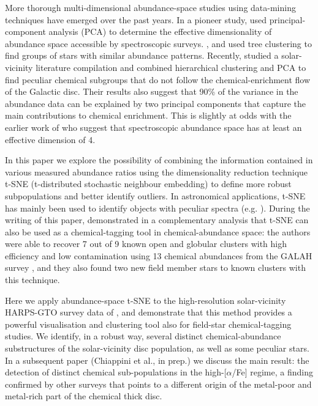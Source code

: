 \documentclass{aa}  %
\begin{document}
More thorough multi-dimensional abundance-space studies using data-mining techniques have emerged over the past years. In a pioneer study, \citet{Ting2012} used principal-component analysis (PCA) to determine the effective dimensionality of abundance space accessible by spectroscopic surveys. \citet{daSilva2012, daSilva2015}, and \citet{Jofre2017} used tree clustering to find groups of stars with similar abundance patterns. Recently, \citet{Boesso2018} studied a solar-vicinity literature compilation and combined hierarchical clustering and PCA to find peculiar chemical subgroups that do not follow the chemical-enrichment flow of the Galactic disc. Their results also suggest that 90\% of the variance in the abundance data can be explained by two principal components that capture the main contributions to chemical enrichment. This is slightly at odds with the earlier work of \citet{Ting2012} who suggest that spectroscopic abundance space has at least an effective dimension of 4.

In this paper we explore the possibility of combining the information contained in various measured abundance ratios using the dimensionality reduction technique t-SNE (t-distributed stochastic neighbour embedding) to define more robust subpopulations and better identify outliers. %
In astronomical applications, t-SNE has mainly been used to identify objects with peculiar spectra (e.g. \citealt{Matijevivc2017, Valentini2017, Traven2017, Reis2018}). During the writing of this paper, \citet{Kos2018} demonstrated in a complementary analysis that t-SNE can also be used as a chemical-tagging tool in chemical-abundance space: the authors were able to recover 7 out of 9 known open and globular clusters with high efficiency and low contamination using 13 chemical abundances from the GALAH survey \citep{Martell2017}, and they also found two new field member stars to known clusters with this technique. 

Here we apply abundance-space t-SNE to the high-resolution solar-vicinity HARPS-GTO survey data of \citet{DelgadoMena2017}, and demonstrate that this method provides a powerful visualisation and clustering tool also for field-star chemical-tagging studies. We identify, in a robust way, several distinct chemical-abundance substructures of the solar-vicinity disc population, as well as some peculiar stars. In a subsequent paper (Chiappini et al., in prep.) we discuss the main result: the detection of distinct chemical sub-populations in the high-[$\alpha$/Fe] regime, a finding confirmed by other surveys that points to a different origin of the metal-poor and metal-rich part of the chemical thick disc. 
\end{document}
